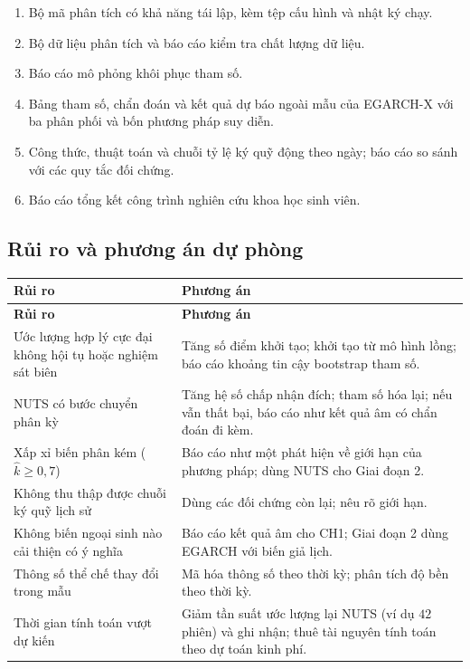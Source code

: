 \documentclass[12pt,a4paper]{article}
\theoremstyle{definition}
\theoremstyle{remark}
\begin{document}
\begin{enumerate}
\item Bộ mã phân tích có khả năng tái lập, kèm tệp cấu hình và nhật ký chạy.
\item Bộ dữ liệu phân tích và báo cáo kiểm tra chất lượng dữ liệu.
\item Báo cáo mô phỏng khôi phục tham số.
\item Bảng tham số, chẩn đoán và kết quả dự báo ngoài mẫu của EGARCH-X với ba phân phối và bốn phương pháp suy diễn.
\item Công thức, thuật toán và chuỗi tỷ lệ ký quỹ động theo ngày; báo cáo so sánh với các quy tắc đối chứng.
\item Báo cáo tổng kết công trình nghiên cứu khoa học sinh viên.
\end{enumerate}

\subsection{Rủi ro và phương án dự phòng}

\begin{longtable}{@{}p{4.6cm}p{9.6cm}@{}}
\toprule
\textbf{Rủi ro} & \textbf{Phương án} \\
\midrule
\endfirsthead
\toprule
\textbf{Rủi ro} & \textbf{Phương án} \\
\midrule
\endhead
\bottomrule
\endfoot
Ước lượng hợp lý cực đại không hội tụ hoặc nghiệm sát biên & Tăng số điểm khởi tạo; khởi tạo từ mô hình lồng; báo cáo khoảng tin cậy bootstrap tham số. \\
NUTS có bước chuyển phân kỳ & Tăng hệ số chấp nhận đích; tham số hóa lại; nếu vẫn thất bại, báo cáo như kết quả âm có chẩn đoán đi kèm. \\
Xấp xỉ biến phân kém ($\hat k\ge0{,}7$) & Báo cáo như một phát hiện về giới hạn của phương pháp; dùng NUTS cho Giai đoạn 2. \\
Không thu thập được chuỗi ký quỹ lịch sử & Dùng các đối chứng còn lại; nêu rõ giới hạn. \\
Không biến ngoại sinh nào cải thiện có ý nghĩa & Báo cáo kết quả âm cho CH1; Giai đoạn 2 dùng EGARCH với biến giả lịch. \\
Thông số thể chế thay đổi trong mẫu & Mã hóa thông số theo thời kỳ; phân tích độ bền theo thời kỳ. \\
Thời gian tính toán vượt dự kiến & Giảm tần suất ước lượng lại NUTS (ví dụ $42$ phiên) và ghi nhận; thuê tài nguyên tính toán theo dự toán kinh phí. \\
\end{longtable}
\end{document}
